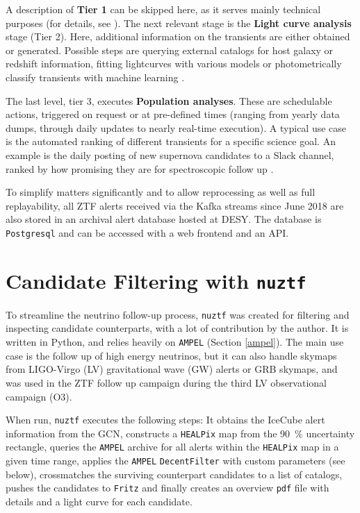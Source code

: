 \documentclass[
    a4paper, %
    fontsize=10pt, %
    twoside=true, %
    numbers=noenddot, %
    fontmethod=tex,
]{kaobook}
\begin{document}
A description of \textbf{Tier 1} can be skipped here, as it serves mainly technical purposes (for details, see \cite{Nordin2019}). The next relevant stage is the \textbf{Light curve analysis} stage (Tier 2). Here, additional information on the transients are either obtained or generated. Possible steps are querying external catalogs for host galaxy or redshift information, fitting lightcurves with various models or photometrically classify transients with machine learning \cite{Nordin2019}.

The last level, tier 3, executes \textbf{Population analyses}. These are schedulable actions, triggered on request or at pre-defined times (ranging from yearly data dumps, through daily updates to nearly real-time execution). A typical use case is the automated ranking of different transients for a specific science goal. An example is the daily posting of new supernova candidates to a Slack channel, ranked by how promising they are for spectroscopic follow up \cite{Nordin2019}.

To simplify matters significantly and to allow reprocessing as well as full replayability, all ZTF alerts received via the Kafka streams since June 2018 are also stored in an archival alert database hosted at DESY. The database is \texttt{Postgresql} and can be accessed with a web frontend and an API.

\section{Candidate Filtering with \texttt{nuztf}}
To streamline the neutrino follow-up process, \texttt{nuztf}  was created for filtering and inspecting candidate counterparts, with a lot of contribution by the author. It is written in Python, and relies heavily on \texttt{AMPEL} (Section \ref{ampel}). The main use case is the follow up of high energy neutrinos, but it can also handle skymaps from LIGO-Virgo (LV)  gravitational wave (GW) alerts or GRB skymaps, and was used in the ZTF follow up campaign  during the third LV observational campaign (O3).

When run, \texttt{nuztf} executes the following steps: It obtains the IceCube alert information from the GCN, constructs a \texttt{HEALPix} map from the \SI{90}{\percent} uncertainty rectangle, queries the \texttt{AMPEL} archive for all alerts within the \texttt{HEALPix} map in a given time range, applies the \texttt{AMPEL} \texttt{DecentFilter} \cite{Nordin2019} with custom parameters (see below), crossmatches the surviving counterpart candidates to a list of catalogs, pushes the candidates to \texttt{Fritz} and finally creates an overview \texttt{pdf} file with details and a light curve for each candidate.
\end{document}
